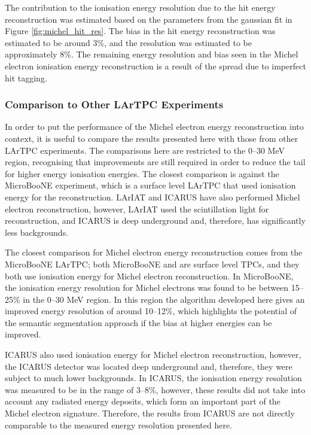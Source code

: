 The contribution to the ionisation energy resolution due to the hit energy
reconstruction was estimated based on the parameters from the gaussian fit in
Figure \ref{fig:michel_hit_res}. The bias in the hit energy reconstruction was
estimated to be around 3\%, and the resolution was estimated to be
approximately 8\%. The remaining energy resolution and bias seen in the Michel
electron ionisation energy reconstruction is a result of the spread due to
imperfect hit tagging.

\subsubsection*{Comparison to Other LArTPC Experiments} \label{ME_COMP}

In order to put the performance of the Michel electron energy
reconstruction into context, it is useful to compare the results presented
here with those from other LArTPC experiments. The comparisons here are
restricted to the 0--30 MeV region, recognising that improvements are still 
required in order to reduce the tail for higher energy ionisation energies.  
The closest comparison is against the MicroBooNE experiment, which is a 
surface level LArTPC that used ionisation energy for the 
reconstruction\cite{Acciarri:2017sjy}. LArIAT and ICARUS have also performed 
Michel electron reconstruction\cite{Amoruso:2003sw,Foreman_2016}, however, 
LArIAT used the scintillation light for reconstruction, and ICARUS is deep 
underground and, therefore, has significantly less backgrounds.

The closest comparison for Michel electron energy reconstruction comes from the
MicroBooNE LArTPC; both MicroBooNE and \protodune{} are surface level TPCs, and
they both use ionisation energy for Michel electron reconstruction. In
MicroBooNE, the ionisation energy resolution for Michel electrons was found to
be between 15--25\% in the 0--30 MeV region\cite{Acciarri:2017sjy}. In this region
the algorithm developed here gives an improved energy resolution of around
10--12\%, which highlights the potential of the semantic segmentation approach
if the bias at higher energies can be improved.

ICARUS also used ionisation energy for Michel electron reconstruction, however,
the ICARUS detector was located deep underground and, therefore, they were
subject to much lower backgrounds. In ICARUS, the ionisation energy resolution
was measured to be in the range of 3--8\%\cite{Amoruso:2003sw}, however, these
results did not take into account any radiated energy deposits, which form an
important part of the Michel electron signature. Therefore, the results from
ICARUS are not directly comparable to the measured energy resolution presented
here.

